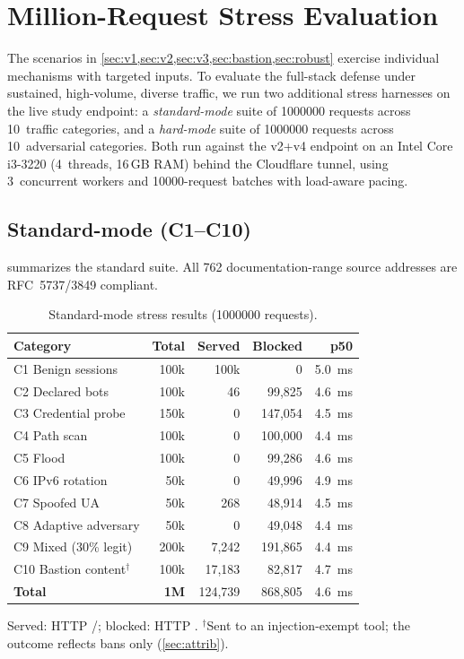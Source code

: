 \documentclass[10pt,twocolumn]{article}
\begin{document}
\section{Million-Request Stress Evaluation}\label{sec:stress}
The scenarios in \cref{sec:v1,sec:v2,sec:v3,sec:bastion,sec:robust} exercise
individual mechanisms with targeted inputs. To evaluate the full-stack defense
under sustained, high-volume, diverse traffic, we run two additional stress
harnesses on the live study endpoint: a \emph{standard-mode} suite of
\num{1000000} requests across 10~traffic categories, and a \emph{hard-mode}
suite of \num{1000000} requests across 10~adversarial categories. Both run
against the v2+v4 endpoint on an Intel Core i3-3220 (4~threads, 16\,GB RAM)
behind the Cloudflare tunnel, using 3~concurrent workers and \num{10000}-request
batches with load-aware pacing.

\subsection{Standard-mode (C1--C10)}
 summarizes the standard suite. All 762 documentation-range
source addresses are RFC~5737/3849 compliant.

\begin{table}[t]
\centering\small
\caption{Standard-mode stress results (\num{1000000} requests).}
\label{tab:stress}
\begin{tabularx}{\columnwidth}{@{}l r r r r@{}}
\toprule
Category & Total & Served & Blocked & p50 \\
\midrule
C1 Benign sessions     & 100k & 100k & 0 & \SI{5.0}{ms} \\
C2 Declared bots       & 100k & 46 & 99,825 & \SI{4.6}{ms} \\
C3 Credential probe    & 150k & 0 & 147,054 & \SI{4.5}{ms} \\
C4 Path scan           & 100k & 0 & 100,000 & \SI{4.4}{ms} \\
C5 Flood               & 100k & 0 & 99,286 & \SI{4.6}{ms} \\
C6 IPv6 rotation       & 50k  & 0 & 49,996 & \SI{4.9}{ms} \\
C7 Spoofed UA          & 50k  & 268 & 48,914 & \SI{4.5}{ms} \\
C8 Adaptive adversary  & 50k  & 0 & 49,048 & \SI{4.4}{ms} \\
C9 Mixed (30\% legit)  & 200k & 7,242 & 191,865 & \SI{4.4}{ms} \\
C10 Bastion content$^\dagger$ & 100k & 17,183 & 82,817 & \SI{4.7}{ms} \\
\midrule
\textbf{Total}         & \textbf{1M} & 124,739 & 868,805 & \SI{4.6}{ms} \\
\bottomrule
\end{tabularx}
\par\smallskip\footnotesize Served: HTTP /; blocked:
HTTP . $^\dagger$Sent to an injection-exempt tool; the outcome
reflects \sys{} bans only (\cref{sec:attrib}).
\end{table}
\end{document}
